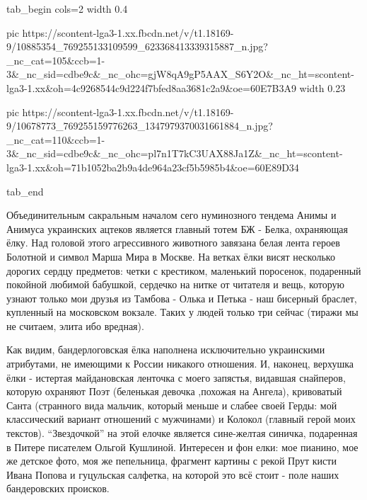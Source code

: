 \ifcmt
  tab_begin cols=2
	width 0.4

     pic https://scontent-lga3-1.xx.fbcdn.net/v/t1.18169-9/10885354_769255133109599_623368413339315887_n.jpg?_nc_cat=105&ccb=1-3&_nc_sid=cdbe9c&_nc_ohc=gjW8qA9gP5AAX_S6Y2O&_nc_ht=scontent-lga3-1.xx&oh=4c9268544c9d224f7bfed8aa3681c2a9&oe=60E7B3A9
	width 0.23

     pic https://scontent-lga3-1.xx.fbcdn.net/v/t1.18169-9/10678773_769255159776263_1347979370031661884_n.jpg?_nc_cat=110&ccb=1-3&_nc_sid=cdbe9c&_nc_ohc=pl7n1T7kC3UAX88Ja1Z&_nc_ht=scontent-lga3-1.xx&oh=71b1052ba2b9a4de964a23cf5b5985b4&oe=60E89D34

  tab_end
\fi


Объединительным сакральным началом сего нуминозного тендема Анимы и Анимуса
украинских ацтеков является главный тотем БЖ - Белка, охраняющая ёлку. Над
головой этого агрессивного животного завязана белая лента героев Болотной и
символ Марша Мира в Москве. На ветках ёлки висят несколько дорогих сердцу
предметов: четки с крестиком, маленький поросенок, подаренный покойной любимой
бабушкой, сердечко на нитке от читателя и вещь, которую узнают только мои
друзья из Тамбова - Олька и Петька - наш бисерный браслет, купленный на
московском вокзале. Таких у людей только три сейчас (тиражи мы не считаем,
элита ибо вредная). 

Как видим, бандерлоговская ёлка наполнена исключительно украинскими атрибутами,
не имеющими к России никакого отношения. И, наконец, верхушка ёлки - истертая
майдановская ленточка с моего запястья, видавшая снайперов, которую охраняют
Поэт (беленькая девочка ,похожая на Ангела), кривоватый Санта (странного вида
мальчик, который меньше и слабее своей Герды: мой классический вариант
отношений с мужчинами) и Колокол (главный герой моих текстов). \enquote{Звездочкой} на
этой елочке является сине-желтая синичка, подаренная в Питере писателем Ольгой
Кушлиной. Интересен и фон елки: мое пианино, мое же детское фото, моя же
пепельница, фрагмент картины с рекой Прут кисти Ивана Попова и гуцульская
салфетка, на которой это всё стоит - поле наших бандеровских происков.

